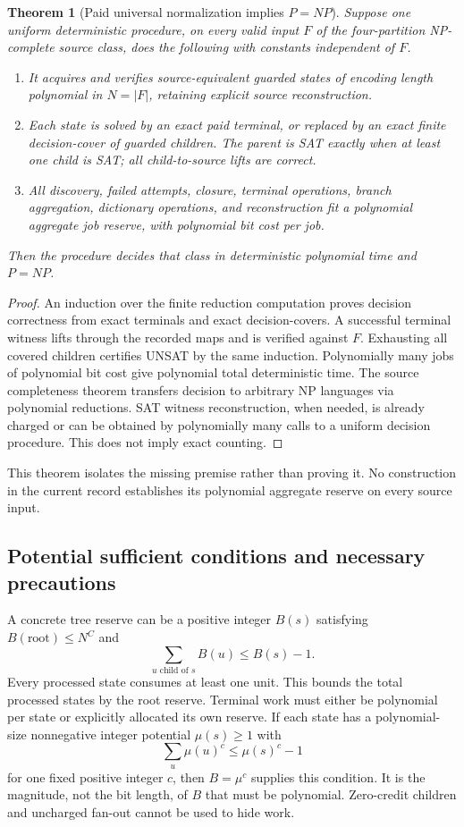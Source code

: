 \documentclass[11pt,letterpaper]{article}
\newtheorem{theorem}{Theorem}
\theoremstyle{definition}
\begin{document}
\begin{theorem}[Paid universal normalization implies $P=NP$]\label{thm:conditional}
Suppose one uniform deterministic procedure, on every valid input $F$ of the four-partition NP-complete source class, does the following with constants independent of $F$.
\begin{enumerate}[label={},leftmargin=0pt,itemsep=3pt]
\item[] It acquires and verifies source-equivalent guarded states of encoding length polynomial in $N=|F|$, retaining explicit source reconstruction.
\item[] Each state is solved by an exact paid terminal, or replaced by an exact finite decision-cover of guarded children. The parent is SAT exactly when at least one child is SAT; all child-to-source lifts are correct.
\item[] All discovery, failed attempts, closure, terminal operations, branch aggregation, dictionary operations, and reconstruction fit a polynomial aggregate job reserve, with polynomial bit cost per job.
\end{enumerate}
Then the procedure decides that class in deterministic polynomial time and $P=NP$.
\end{theorem}
\begin{proof}
An induction over the finite reduction computation proves decision correctness from exact terminals and exact decision-covers. A successful terminal witness lifts through the recorded maps and is verified against $F$. Exhausting all covered children certifies UNSAT by the same induction. Polynomially many jobs of polynomial bit cost give polynomial total deterministic time. The source completeness theorem transfers decision to arbitrary NP languages via polynomial reductions. SAT witness reconstruction, when needed, is already charged or can be obtained by polynomially many calls to a uniform decision procedure. This does not imply exact counting.
\end{proof}

This theorem isolates the missing premise rather than proving it. No construction in the current record establishes its polynomial aggregate reserve on every source input.

\subsection{Potential sufficient conditions and necessary precautions}

A concrete tree reserve can be a positive integer $B(s)$ satisfying $B(\text{root})\le N^C$ and
\[
\sum_{u\text{ child of }s}B(u)\le B(s)-1.
\]
Every processed state consumes at least one unit. This bounds the total processed states by the root reserve. Terminal work must either be polynomial per state or explicitly allocated its own reserve. If each state has a polynomial-size nonnegative integer potential $\mu(s)\ge1$ with
\[
\sum_u\mu(u)^c\le\mu(s)^c-1
\]
for one fixed positive integer $c$, then $B=\mu^c$ supplies this condition. It is the magnitude, not the bit length, of $B$ that must be polynomial. Zero-credit children and uncharged fan-out cannot be used to hide work.
\end{document}
